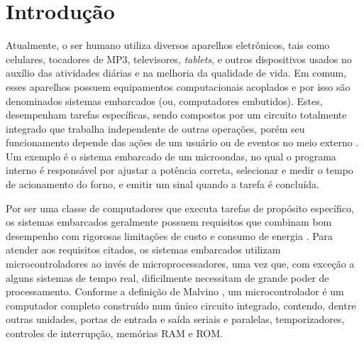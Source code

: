 
\chapter{Introdução} \label{Cap:Introducao}

Atualmente, o ser humano utiliza diversos aparelhos eletrônicos, tais como celulares, tocadores de MP3, televisores, \textit{tablets}, e outros dispositivos usados no auxílio das atividades diárias e na melhoria da qualidade de vida. Em comum, esses aparelhos possuem equipamentos computacionais acoplados e por isso são denominados sistemas embarcados (ou, computadores embutidos). Estes, desempenham tarefas específicas, sendo compostos por um circuito totalmente integrado que trabalha independente de outras operações, porém seu funcionamento depende das ações de um usuário ou de eventos no meio externo \cite{Cunha:2007}. Um exemplo é o sistema embarcado de um microondas, no qual o programa interno é responsável por ajustar a potência correta, selecionar e medir o tempo de acionamento do forno, e emitir um sinal quando a tarefa é concluída.

Por ser uma classe de computadores que executa tarefas de propósito específico, os sistemas embarcados geralmente possuem requisitos que combinam bom desempenho com rigorosas limitações de custo e consumo de energia \cite{Kruger:2014}. Para atender aos requisitos citados, os sistemas embarcados utilizam microcontroladores ao invés de microprocessadores, uma vez que, com exceção a alguns sistemas de tempo real, dificilmente necessitam de grande poder de processamento. Conforme a definição de Malvino \cite{Malvino:1985}, um microcontrolador é um computador completo construído num único circuito integrado, contendo, dentre outras unidades, portas de entrada e saída seriais e paralelas, temporizadores, controles de interrupção, memórias RAM e ROM. 


